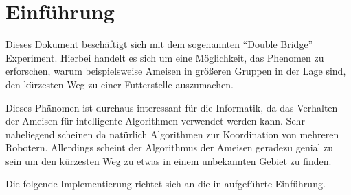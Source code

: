 
\section{Einführung}

Dieses Dokument beschäftigt sich mit dem sogenannten "`Double Bridge"'
Experiment. Hierbei handelt es sich um eine Möglichkeit, das Phenomen
zu erforschen, warum beispielsweise Ameisen in größeren Gruppen in der
Lage sind, den kürzesten Weg zu einer Futterstelle auszumachen.

Dieses Phänomen ist durchaus interessant für die Informatik, da das
Verhalten der Ameisen für intelligente Algorithmen verwendet werden
kann. Sehr naheliegend scheinen da natürlich Algorithmen zur
Koordination von mehreren Robotern. Allerdings scheint der Algorithmus
der Ameisen geradezu genial zu sein um den kürzesten Weg zu etwas in einem
unbekannten Gebiet zu finden.

Die folgende Implementierung richtet sich an die in \cite{kramer2009computational}
aufgeführte Einführung.